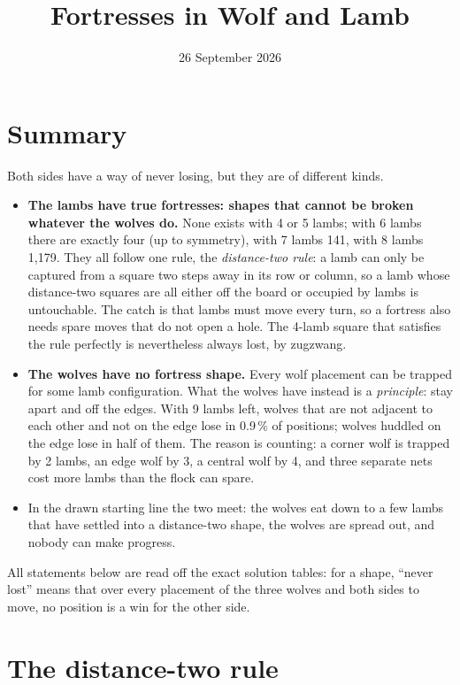 \documentclass[11pt,a4paper]{article}
\title{Fortresses in Wolf and Lamb}
\author{}
\date{26 September 2026}
\begin{document}
\maketitle

\section*{Summary}

Both sides have a way of never losing, but they are of different kinds.

\begin{itemize}
\item \textbf{The lambs have true fortresses: shapes that cannot be broken whatever
the wolves do.} None exists with 4 or 5 lambs; with 6 lambs there are exactly four
(up to symmetry), with 7 lambs 141, with 8 lambs 1{,}179. They all follow one
rule, the \emph{distance-two rule}: a lamb can only be captured from a square two
steps away in its row or column, so a lamb whose distance-two squares are all
either off the board or occupied by lambs is untouchable. The catch is that
lambs must move every turn, so a fortress also needs spare moves that do not open
a hole. The 4-lamb square that satisfies the rule perfectly is nevertheless
always lost, by zugzwang.
\item \textbf{The wolves have no fortress shape.} Every wolf placement can be
trapped for some lamb configuration. What the wolves have instead is a
\emph{principle}: stay apart and off the edges. With 9 lambs left, wolves that
are not adjacent to each other and not on the edge lose in 0.9\,\% of positions;
wolves huddled on the edge lose in half of them. The reason is counting: a corner
wolf is trapped by 2 lambs, an edge wolf by 3, a central wolf by 4, and three
separate nets cost more lambs than the flock can spare.
\item In the drawn starting line the two meet: the wolves eat down to a few lambs
that have settled into a distance-two shape, the wolves are spread out, and
nobody can make progress.
\end{itemize}

All statements below are read off the exact solution tables: for a shape, ``never
lost'' means that over every placement of the three wolves and both sides to
move, no position is a win for the other side.

\section*{The distance-two rule}
\end{document}
